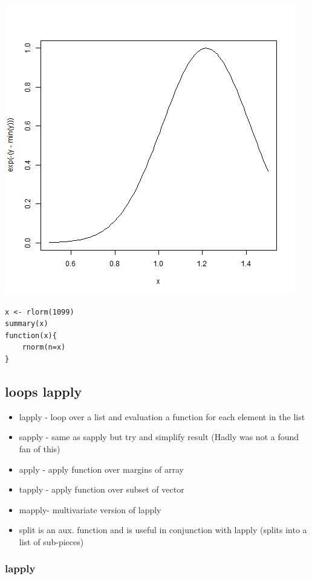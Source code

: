 \documentclass[11pt]{article}
\begin{document}
\includegraphics[width=.9\linewidth]{LL3.png}


\begin{verbatim}
x <- rlorm(1099)
summary(x)
function(x){
    rnorm(n=x)
}
\end{verbatim}
\subsection{loops lapply}
\label{sec-2-4}


\begin{itemize}
\item lapply - loop over a list and evaluation a function for each
  element in the list
\item sapply - same as sapply but try and simplify result (Hadly was not
  a found fan of this)
\item apply - apply function over margins of array
\item tapply - apply function over subset of vector
\item mapply- multivariate version of lapply
\item split is an aux. function and is useful in conjunction with lapply
  (splits into a list of sub-pieces)
\end{itemize}
\subsubsection{lapply}
\label{sec-2-4-1}
\end{document}
